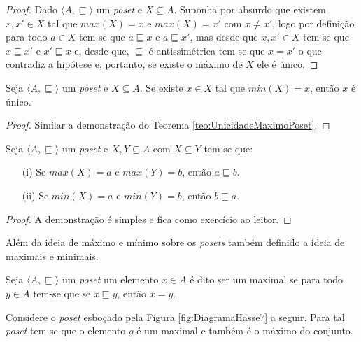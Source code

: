 \begin{proof}
	Dado $\langle A, \sqsubseteq \rangle$ um \textit{poset} e $X \subseteq A$. Suponha por absurdo que existem $x, x' \in X$ tal que $max(X) = x$ e $max(X) = x'$ com $x \neq x'$, logo por definição para todo $a \in X$ tem-se que $a \sqsubseteq x$ e $a \sqsubseteq x'$, mas desde que $x, x '\in X$ tem-se que $x \sqsubseteq x'$ e $x' \sqsubseteq x$ e, desde que, $\sqsubseteq$ é antissimétrica tem-se que $x = x'$ o que contradiz a hipótese e, portanto, se existe o máximo de $X$ ele é único.
\end{proof}

\begin{teorema}\label{teo:UnicidadeMinimoPoset}
	Seja $\langle A, \sqsubseteq \rangle$ um \textit{poset} e $X \subseteq A$. Se existe $x \in X$ tal que $min(X) = x$, então $x$ é único.
\end{teorema}

\begin{proof}
	Similar a demonstração do Teorema \ref{teo:UnicidadeMaximoPoset}.
\end{proof}

\begin{teorema}\label{teo:MonotonicidadeInclusaoMaxMin}
	Seja $\langle A, \sqsubseteq \rangle$ um \textit{poset} e $X, Y \subseteq A$ com $X \subseteq Y$ tem-se que:
	\begin{itemize}
		\item[(i)] Se $max(X) = a$ e $max(Y) = b$, então $a \sqsubseteq b$.
		\item[(ii)] Se $min(X) = a$ e $min(Y) = b$, então $b \sqsubseteq a$.
	\end{itemize}
\end{teorema}

\begin{proof}
	A demonstração é simples e fica como exercício ao leitor.
\end{proof}

Além da ideia de máximo e mínimo sobre os \textit{posets} também definido a ideia de maximais e minimais.

\begin{definicao}\label{def:MaximaisPoset}
	Seja $\langle A, \sqsubseteq \rangle$ um \textit{poset}  um elemento $x \in A$ é dito ser um maximal se para todo $y \in A$ tem-se que se $x \sqsubseteq y$, então $x = y$.
\end{definicao}

\begin{exemplo}
  Considere o \textit{poset} esboçado pela Figura \ref{fig:DiagramaHasse7} a seguir. Para tal \textit{poset} tem-se que o elemento $g$ é um maximal e também é o máximo do conjunto.
\end{exemplo}

